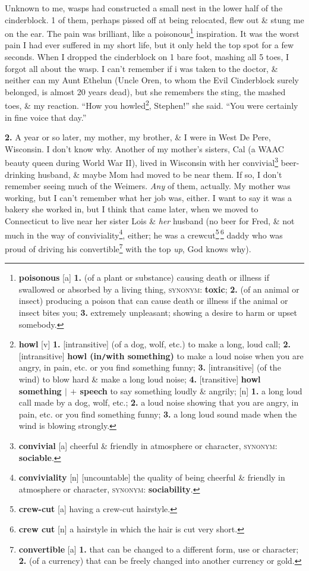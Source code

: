 \documentclass[oneside]{book}
\numberwithin{equation}{section}
\begin{document}
Unknown to me, wasps had constructed a small nest in the lower half of the cinderblock. 1 of them, perhaps pissed off at being relocated, flew out \& stung me on the ear. The pain was brilliant, like a poisonous\footnote{\textbf{poisonous} [a] \textbf{1.} (of a plant or substance) causing death or illness if swallowed or absorbed by a living thing, \textsc{synonym}: \textbf{toxic}; \textbf{2.} (of an animal or insect) producing a poison that can cause death or illness if the animal or insect bites you; \textbf{3.} extremely unpleasant; showing a desire to harm or upset somebody.} inspiration. It was the worst pain I had ever suffered in my short life, but it only held the top spot for a few seconds. When I dropped the cinderblock on 1 bare foot, mashing all 5 toes, I forgot all about the wasp. I can't remember if i was taken to the doctor, \& neither can my Aunt Ethelun (Uncle Oren, to whom the Evil Cinderblock surely belonged, is almost 20 years dead), but she remembers the sting, the mashed toes, \& my reaction. ``How you howled\footnote{\textbf{howl} [v] \textbf{1.} [intransitive] (of a dog, wolf, etc.) to make a long, loud call; \textbf{2.} [intransitive] \textbf{howl (in\texttt{/}with something)} to make a loud noise when you are angry, in pain, etc. or you find something funny; \textbf{3.} [intransitive] (of the wind) to blow hard \& make a long loud noise; \textbf{4.} [transitive] \textbf{howl something $|$ $+$ speech} to say something loudly \& angrily; [n] \textbf{1.} a long loud call made by a dog, wolf, etc.; \textbf{2.} a loud noise showing that you are angry, in pain, etc. or you find something funny; \textbf{3.} a long loud sound made when the wind is blowing strongly.}, Stephen!'' she said. ``You were certainly in fine voice that day.''

\textbf{2.} A year or so later, my mother, my brother, \& I were in West De Pere, Wisconsin. I don't know why. Another of my mother's sisters, Cal (a WAAC beauty queen during World War II), lived in Wisconsin with her convivial\footnote{\textbf{convivial} [a] cheerful \& friendly in atmosphere or character, \textsc{synonym}: \textbf{sociable}.} beer-drinking husband, \& maybe Mom had moved to be near them. If so, I don't remember seeing much of the Weimers. \textit{Any} of them, actually. My mother was working, but I can't remember what her job was, either. I want to say it was a bakery she worked in, but I think that came later, when we moved to Connecticut to live near her sister Lois \& \textit{her} husband (no beer for Fred, \& not much in the way of conviviality\footnote{\textbf{conviviality} [n] [uncountable] the quality of being cheerful \& friendly in atmosphere or character, \textsc{synonym}: \textbf{sociability}.}, either; he was a crewcut\footnote{\textbf{crew-cut} [a] having a crew-cut hairstyle.}\,\footnote{\textbf{crew cut} [n] a hairstyle in which the hair is cut very short.} daddy who was proud of driving his convertible\footnote{\textbf{convertible} [a] \textbf{1.} that can be changed to a different form, use or character; \textbf{2.} (of a currency) that can be freely changed into another currency or gold.} with the top \textit{up}, God knows why).
\end{document}
